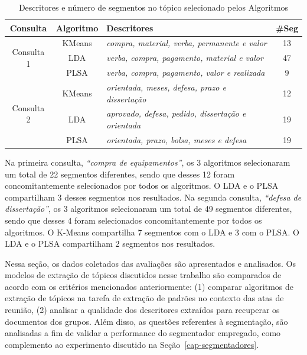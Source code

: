 \begin{table}[!h]
\begin{tabular}{|c|c|l|c|}
 \hline 
 \textbf{Consulta} &\textbf{Algoritmo }& \textbf{Descritores }& \textbf{\#Seg} \\ \hline
 \multirow{3}{*}{Consulta 1} &
 KMeans & \textit{compra, material, verba, permanente e valor} & 13 \\  \cline{2-4} 
 & LDA    & \textit{verba, compra, pagamento, material e valor}  & 47 \\  \cline{2-4}
 & PLSA   & \textit{verba, compra, pagamento, valor e realizada} & 9  \\  \hline 
 \multirow{3}{*}{Consulta 2} &
 KMeans & \textit{orientada, meses, defesa, prazo e dissertação} & 12 \\  \cline{2-4}
 & LDA    & \textit{aprovado, defesa, pedido, dissertação e orientada} & 19 \\ \cline{2-4} 
 & PLSA   & \textit{orientada, prazo, bolsa, meses e defesa} & 19 \\  \hline 
 \end{tabular}  
 \label{tab:segquanti}
 \caption{Descritores e número de segmentos no tópico selecionado pelos Algoritmos}
\end{table} 

Na primeira consulta, \textit{``compra de equipamentos''},  os 3 algoritmos selecionaram um total de 22 segmentos diferentes, sendo que desses 12 foram concomitantemente selecionados por todos os algoritmos. O LDA e o PLSA compartilham 3 desses segmentos nos resultados.
Na segunda  consulta, \textit{``defesa de dissertação''}, os 3 algoritmos selecionaram um total de 49 segmentos diferentes, sendo que desses 4 foram selecionados concomitantemente por todos os algoritmos. O K-Means compartilha 7 segmentos com o LDA e 3 com o PLSA. O LDA e o PLSA compartilham 2 segmentos nos resultados.



Nessa seção, os dados coletados das avaliações são apresentados e analisados. Os modelos de extração de tópicos discutidos nesse trabalho são comparados de acordo com os critérios mencionados anteriormente: 
(1) comparar algoritmos de extração de tópicos na tarefa de extração de padrões no contexto das atas de reunião, 
(2) analisar a qualidade dos descritores extraídos para recuperar os documentos dos grupos.
Além disso, as questões referentes à segmentação, são analisadas a fim de 
validar a performance do segmentador empregado, como complemento ao experimento discutido na Seção~\ref{cap-segmentadores}.


